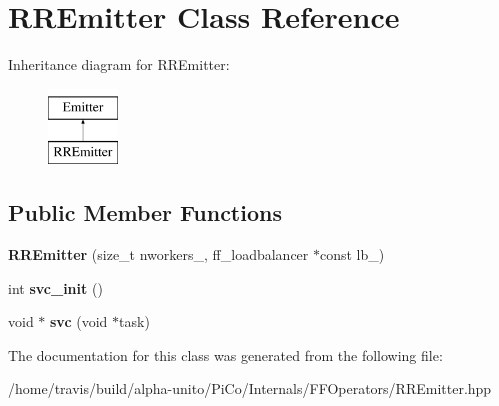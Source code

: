 \hypertarget{class_r_r_emitter}{\section{\-R\-R\-Emitter \-Class \-Reference}
\label{class_r_r_emitter}
}
\-Inheritance diagram for \-R\-R\-Emitter\-:\begin{figure}[H]
\begin{center}
\leavevmode
\includegraphics[height=2.000000cm]{class_r_r_emitter}
\end{center}
\end{figure}
\subsection*{\-Public \-Member \-Functions}
\begin{DoxyCompactItemize}
\item 
\hypertarget{class_r_r_emitter_a8c6821b08870a2c8f604d12c7631dd3b}{{\bfseries \-R\-R\-Emitter} (size\-\_\-t nworkers\-\_\-, ff\-\_\-loadbalancer $\ast$const lb\-\_\-)}\label{class_r_r_emitter_a8c6821b08870a2c8f604d12c7631dd3b}

\item 
\hypertarget{class_r_r_emitter_a0d811e077926a3084e9b009b95cf0e16}{int {\bfseries svc\-\_\-init} ()}\label{class_r_r_emitter_a0d811e077926a3084e9b009b95cf0e16}

\item 
\hypertarget{class_r_r_emitter_a388a5d63935e5d1014f75de6ba45003b}{void $\ast$ {\bfseries svc} (void $\ast$task)}\label{class_r_r_emitter_a388a5d63935e5d1014f75de6ba45003b}

\end{DoxyCompactItemize}


\-The documentation for this class was generated from the following file\-:\begin{DoxyCompactItemize}
\item 
/home/travis/build/alpha-\/unito/\-Pi\-Co/\-Internals/\-F\-F\-Operators/\-R\-R\-Emitter.\-hpp\end{DoxyCompactItemize}
